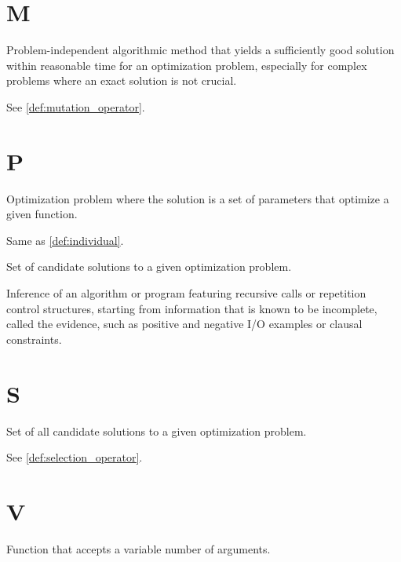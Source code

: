   \section*{M}
    \begin{definition}[Metaheuristics]
    \label{def:metaheuristic}
      Problem-independent algorithmic method that yields a sufficiently good solution within 
      reasonable time for an optimization problem, especially for complex problems where an exact 
      solution is not crucial.
    \end{definition}

    \begin{definition}[Mutator]
    \label{def:mutator}
      See \vref{def:mutation_operator}.
    \end{definition}

  \section*{P}
    \begin{definition}
    \label{def:parameter_optimization}
      Optimization problem where the solution is a set of parameters that 
      optimize a given function.
    \end{definition}

    \begin{definition}[Phenotype]
    \label{def:phenotype}
      Same as \vref{def:individual}.
    \end{definition}

    \begin{definition}[Population]
    \label{def:population}
      Set of candidate solutions to a given optimization problem.
    \end{definition}

    \begin{definition}
    \label{def:program_induction}
      Inference of an algorithm or program featuring recursive calls or 
      repetition control structures, starting from information that is known to 
      be incomplete, called the evidence, such as positive and negative I/O 
      examples or clausal constraints.
    \end{definition}

  \section*{S}
    \begin{definition}
    \label{def:search_space}
      Set of all candidate solutions to a given optimization problem.
    \end{definition}

    \begin{definition}[Selector]
      See \vref{def:selection_operator}.
    \end{definition}

  \section*{V}
    \begin{definition}
    \label{def:variadic_function}
      Function that accepts a variable number of arguments.  
    \end{definition}
